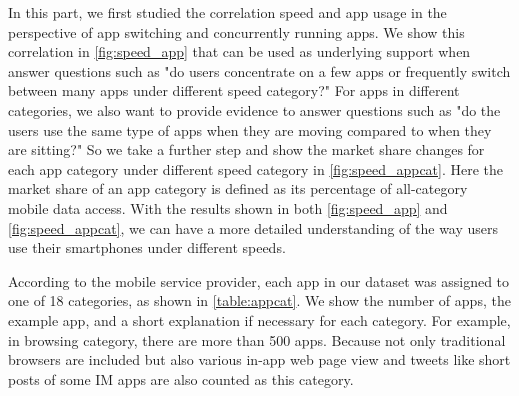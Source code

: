 In this part, we first studied the correlation speed and app usage in the perspective of app switching and concurrently running apps. We show this correlation in \autoref{fig:speed_app} that can be used as underlying support when answer questions such as "do users concentrate on a few apps or frequently switch between many apps under different speed category?" For apps in different categories, we also want to provide evidence to answer questions such as "do the users use the same type of apps when they are moving compared to when they are sitting?" So we take a further step and show the market share changes for each app category under different speed category in \autoref{fig:speed_appcat}. Here the market share of an app category is defined as its percentage of all-category mobile data access. With the results shown in both \autoref{fig:speed_app} and \autoref{fig:speed_appcat}, we can have a more detailed understanding of the way users use their smartphones under different speeds.

According to the mobile service provider, each app in our dataset was assigned to one of 18 categories, as shown in \autoref{table:appcat}. We show the number of apps, the example app, and a short explanation if necessary for each category. For example, in browsing category, there are more than 500 apps. Because not only traditional browsers are included but also various in-app web page view and tweets like short posts of some IM apps are also counted as this category.

